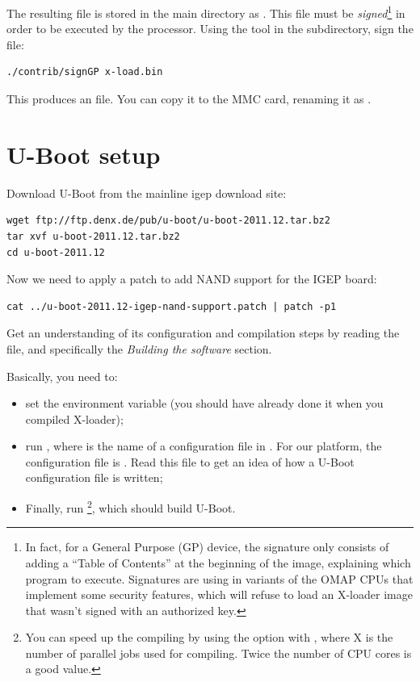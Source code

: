 The resulting file is stored in the  main directory as
. This file must be {\em signed}\footnote{In fact,
  for a General Purpose (GP) device, the signature only consists of
  adding a “Table of Contents” at the beginning of the image,
  explaining which program to execute. Signatures are using in variants
  of the OMAP CPUs that implement some security features, which will refuse
  to load an X-loader image that wasn't signed with an authorized key.}
  in order to be executed by the processor. Using the  tool in the 
subdirectory, sign the  file:

\begin{verbatim}
./contrib/signGP x-load.bin
\end{verbatim}

This produces an  file. You can copy it to the
MMC card, renaming it as .

\section{U-Boot setup}

Download U-Boot from the mainline igep download site:

\begin{verbatim}
wget ftp://ftp.denx.de/pub/u-boot/u-boot-2011.12.tar.bz2
tar xvf u-boot-2011.12.tar.bz2
cd u-boot-2011.12
\end{verbatim}

Now we need to apply a patch to add NAND support for the IGEP board:

\begin{verbatim}
cat ../u-boot-2011.12-igep-nand-support.patch | patch -p1
\end{verbatim}

Get an understanding of its configuration and compilation steps by
reading the  file, and specifically the {\em Building the
  software} section.

Basically, you need to:

\begin{itemize}

\item set the  environment variable (you should
  have already done it when you compiled X-loader);

\item run , where  is the name
  of a configuration file in . For our
  platform, the configuration file is
  . Read this file to get an idea of
  how a U-Boot configuration file is written;

\item Finally, run \footnote{You can speed up the compiling
  by using the  option with , where X is the number of parallel
  jobs used for compiling. Twice the number of CPU cores is a good
  value.}, which should build U-Boot.

\end{itemize}

